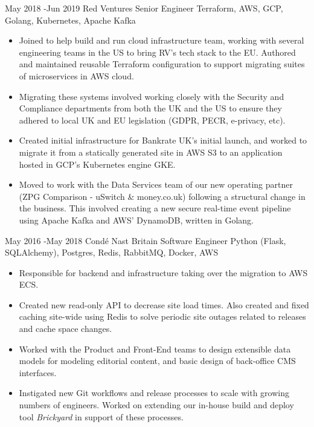 \documentclass[10pt]{article} %
\begin{document}
\jobheader
{May 2018 -}{Jun 2019}
{Red Ventures}
{Senior Engineer}
{ 
      Terraform,
      AWS,
      GCP,
      Golang,
      Kubernetes,
      Apache Kafka
}
  \begin{itemize}

  \item Joined to help build and run cloud infrastructure team, working
        with several engineering teams in the US to bring RV's tech stack to the EU.
        Authored and maintained reusable Terraform configuration to support migrating
        suites of microservices in AWS cloud.

  \item Migrating these systems involved working closely with the Security
        and Compliance departments from both the UK and the US to ensure they
        adhered to local UK and EU legislation (GDPR, PECR, e-privacy, etc).

  \item Created initial infrastructure for Bankrate UK's initial launch, and worked
        to migrate it from a statically generated site in AWS S3 to an application hosted
        in GCP's Kubernetes engine GKE.

  \item Moved to work with the Data Services team of our new operating partner
        (ZPG Comparison - uSwitch \& money.co.uk) following a structural change
        in the business. This involved creating a new secure real-time event
        pipeline using Apache Kafka and AWS' DynamoDB, written in Golang.

  \end{itemize}


\jobheader
{May 2016 -}{May 2018}
{Condé Nast Britain}
{Software Engineer}
{
      Python (Flask, SQLAlchemy),
      Postgres,
      Redis,
      RabbitMQ,
      Docker,
      AWS    
}
  \begin{itemize}

      \item Responsible for backend and infrastructure taking over the migration to AWS ECS.

      \item Created new read-only API to decrease site load times. Also created and fixed
            caching site-wide using Redis to solve periodic site outages related to
            releases and cache space changes.

      \item Worked with the Product and Front-End teams to design extensible data models
            for modeling editorial content, and basic design of back-office CMS
            interfaces.

      \item Instigated new Git workflows and release processes to scale with growing
            numbers of engineers. Worked on extending our in-house build and deploy
            tool \textit{Brickyard} in support of these processes.

  \end{itemize}
\end{document}
